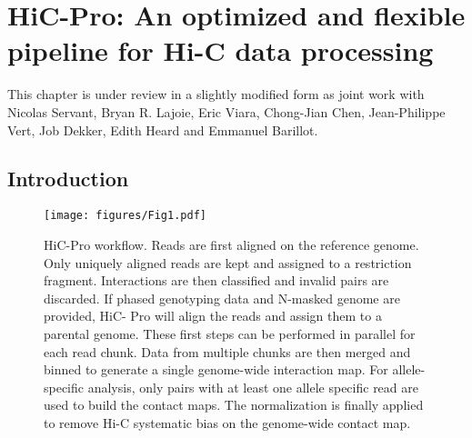 \chapter{HiC-Pro: An optimized and flexible pipeline for Hi-C data
processing}

\graphicspath{{10_hicpro/}}

\begin{work}

This chapter is under review in a slightly modified form as joint work with
Nicolas Servant, Bryan R. Lajoie, Eric Viara, Chong-Jian Chen, Jean-Philippe
Vert, Job Dekker, Edith Heard and Emmanuel Barillot.

\end{work}

\begin{abstract}{Abstract}

HiC-Pro is an optimized and flexible pipeline for processing Hi-C data from
raw reads to normalized contact maps. HiC-Pro maps reads, detects valid
ligation products, performs quality controls and generates intra and
inter-chromosomal contact maps. It includes a fast implementation of the
iterative correction method and is based on a memory-efficient data format for
Hi-C contact maps. In addition, HiC-Pro can use phased genotype data to build
allele-specific contact maps. We applied HiC-Pro on different Hi-C dataset
demonstrating its ability to easily process large data in a reasonable time.
Source code and documentation are available at
\href{http://github.com/nservant/HiC-Pro.Introduction}{
http://github.com/nservant/HiC-Pro.Introduction}
\end{abstract}

\section{Introduction}

\begin{figure}
\texttt{[image: figures/Fig1.pdf]}
\caption{HiC-Pro workflow. Reads are first aligned on the reference genome.
Only uniquely aligned reads are kept and assigned to a restriction fragment.
Interactions are then classified and invalid pairs are discarded. If phased
genotyping data and N-masked genome are provided, HiC- Pro will align the
reads and assign them to a parental genome. These first steps can be performed
in parallel for each read chunk. Data from multiple chunks are then merged and
binned to generate a single genome-wide interaction map. For allele-specific
analysis, only pairs with at least one allele specific read are used to build
the contact maps. The normalization is finally applied to remove Hi-C
systematic bias on the genome-wide contact map.}
\label{fig:fig1}
\end{figure}


